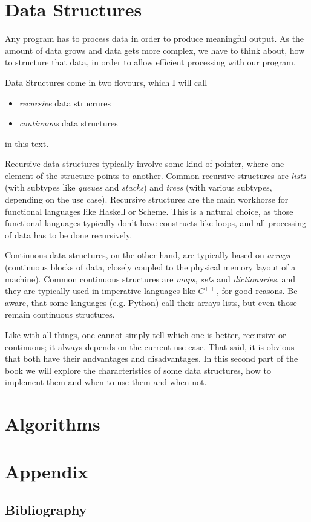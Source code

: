 \documentclass{scrbook}
\numberwithin{equation}{chapter}
\theoremstyle{definition}
\begin{document}





\part{Data Structures}

Any program has to process data in order to produce meaningful output.
As the amount of data grows and data gets more complex, we have to think about,
how to structure that data, in order to allow efficient processing with our program.

Data Structures come in two flovours, which I will call
\begin{itemize}
  \item \emph{recursive} data strucrures
  \item \emph{continuous} data structures
\end{itemize}

in this text.

Recursive data structures typically involve some kind of pointer,
where one element of the structure points to another.
Common recursive structures are \emph{lists} (with subtypes like \emph{queues}
and \emph{stacks}) and \emph{trees} (with various subtypes, depending on the use case).
Recursive structures are the main workhorse for functional languages like
Haskell or Scheme. This is a natural choice, as those functional languages typically
don't have constructs like loops, and all processing of data has to be done recursively.

Continuous data structures, on the other hand, are typically based on \emph{arrays}
(continuous blocks of data, closely coupled to the physical memory layout of a machine).
Common continuous structures are \emph{maps}, \emph{sets} and \emph{dictionaries},
and they are typically used in imperative languages like $C^{++}$, for good reasons.
Be aware, that some languages (e.g. Python) call their arrays lists, but even those remain
continuous structures.

Like with all things, one cannot simply tell which one is better, recursive or continuous;
it always depends on the current use case.
That said, it is obvious that both have their andvantages and disadvantages.
In this second part of the book we will explore the characteristics of some data structures,
how to implement them and when to use them and when not.






\part{Algorithms}


\part{Appendix}
\appendix


\backmatter
\chapter{Bibliography}
\end{document}
